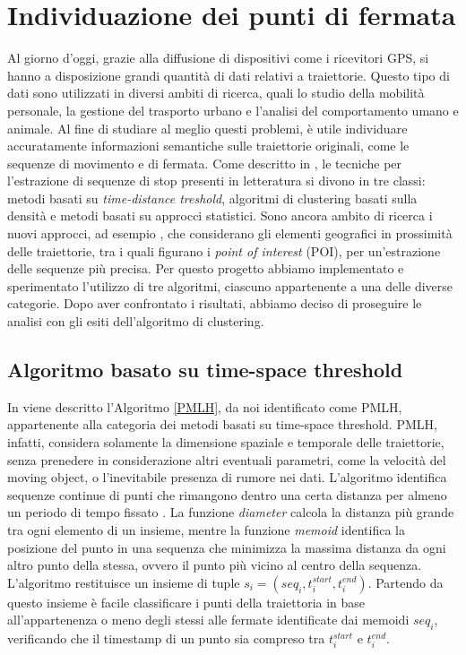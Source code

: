 \documentclass[12pt]{article}
\begin{document}
\section{Individuazione dei punti di fermata}
Al giorno d'oggi, grazie alla diffusione di dispositivi come i ricevitori GPS, si hanno a disposizione grandi quantità di dati relativi a traiettorie.
Questo tipo di dati sono utilizzati in diversi ambiti di ricerca, quali lo studio della mobilità personale, la gestione del trasporto urbano e l'analisi del comportamento umano e animale.
Al fine di studiare al meglio questi problemi, è utile individuare accuratamente informazioni semantiche sulle traiettorie originali, come le sequenze di movimento e di fermata.
Come descritto in \cite{ReviewMethods}, le tecniche per l'estrazione di sequenze di stop presenti in letteratura si divono in tre classi: metodi basati su \emph{time-distance treshold}, algoritmi di clustering basati sulla densità e metodi basati su approcci statistici.
Sono ancora ambito di ricerca i nuovi approcci, ad esempio \cite{ReviewMethods}, che considerano gli elementi geografici in prossimità delle traiettorie, tra i quali figurano i \emph{point of interest} (POI), per un'estrazione delle sequenze più precisa.
Per questo progetto abbiamo implementato e sperimentato l'utilizzo di tre algoritmi, ciascuno appartenente a una delle diverse categorie. Dopo aver confrontato i risultati, abbiamo deciso di proseguire le analisi con gli esiti dell'algoritmo di clustering.

\subsection{Algoritmo basato su time-space threshold}
In \cite{SpaceTimeTreshold} viene descritto l'Algoritmo \ref{PMLH}, da noi identificato come PMLH, appartenente alla categoria dei metodi basati su time-space threshold.
PMLH, infatti, considera solamente la dimensione spaziale e temporale delle traiettorie, senza prenedere in considerazione altri eventuali parametri, come la velocità del moving object, o l'inevitabile presenza di rumore nei dati.
L'algoritmo identifica sequenze continue di punti che rimangono dentro una certa distanza per almeno un periodo di tempo fissato .
La funzione \emph{diameter} calcola la distanza più grande tra ogni elemento di un insieme, mentre la funzione \emph{memoid} identifica la posizione del punto in una sequenza che minimizza la massima distanza da ogni altro punto della stessa, ovvero il punto più vicino al centro della sequenza.
L'algoritmo restituisce un insieme di tuple  $s_i=(seq_i, t_i^{start}, t_i^{end})$. Partendo da questo insieme è facile classificare i punti della traiettoria in base all'appartenenza o meno degli stessi alle fermate identificate dai memoidi $seq_i$, verificando che il timestamp di un punto sia compreso tra $t_i^{start}$ e $t_i^{end}$.
\end{document}
